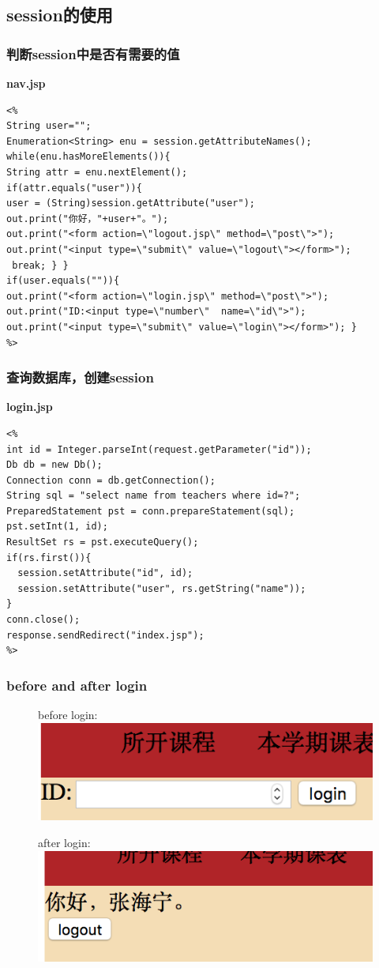 \documentclass{beamer}
\begin{document}
\subsection{session的使用}
\begin{frame}[fragile]
\frametitle{判断session中是否有需要的值}
\textbf{nav.jsp}
\begin{lstlisting}
<%	
String user="";
Enumeration<String> enu = session.getAttributeNames();
while(enu.hasMoreElements()){
String attr = enu.nextElement();
if(attr.equals("user")){
user = (String)session.getAttribute("user");
out.print("你好，"+user+"。");
out.print("<form action=\"logout.jsp\" method=\"post\">");
out.print("<input type=\"submit\" value=\"logout\"></form>");
 break; } }
if(user.equals("")){
out.print("<form action=\"login.jsp\" method=\"post\">");
out.print("ID:<input type=\"number\"  name=\"id\">");
out.print("<input type=\"submit\" value=\"login\"></form>"); }
%>
\end{lstlisting}
\end{frame}

\begin{frame}[fragile]
\frametitle{查询数据库，创建session}
\textbf{login.jsp}
\begin{lstlisting}
<%
int id = Integer.parseInt(request.getParameter("id"));
Db db = new Db();
Connection conn = db.getConnection();
String sql = "select name from teachers where id=?";
PreparedStatement pst = conn.prepareStatement(sql);
pst.setInt(1, id);
ResultSet rs = pst.executeQuery();
if(rs.first()){
  session.setAttribute("id", id);
  session.setAttribute("user", rs.getString("name"));
}
conn.close();
response.sendRedirect("index.jsp");
%>
\end{lstlisting}
\end{frame}
\begin{frame}
\frametitle{before and after login}
\begin{figure}
before login:
\includegraphics{sql5.png}

after login:
\includegraphics{sql6.png}
\end{figure}
\end{frame}
\end{document}
